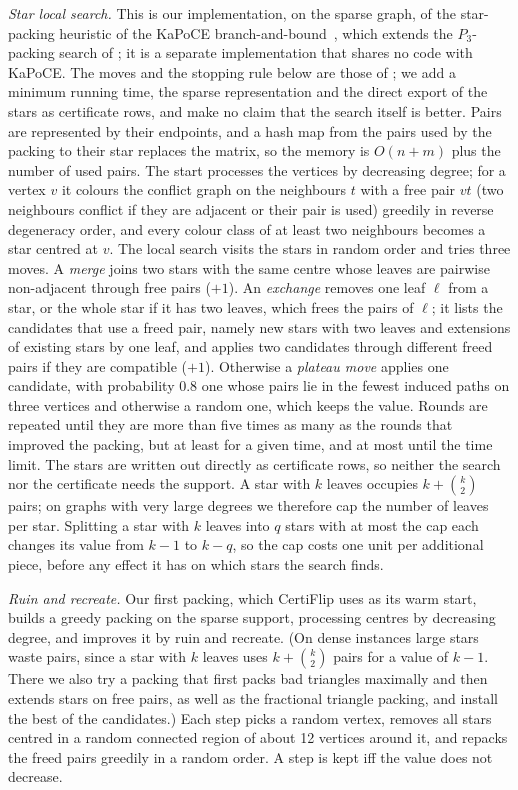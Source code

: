 \emph{Star local search.}  This is our implementation, on the sparse graph,
of the star-packing heuristic of the KaPoCE
branch-and-bound~\cite{BlasiusEtAl22sea}, which extends the $P_3$-packing
search of \citet{GottesburenHSSWZ20}; it is a separate implementation that
shares no code with KaPoCE.  The moves and the stopping rule below are those
of \citet{BlasiusEtAl22sea}; we add a minimum running time, the sparse
representation and the direct export of the stars as certificate rows, and
make no claim that the search itself is better.
Pairs are represented by their endpoints, and a hash map from the pairs used
by the packing to their star replaces the matrix, so the memory is
$O(n+m)$ plus the number of used pairs.  The start processes the vertices
by decreasing degree; for a vertex $v$ it colours the conflict graph on the
neighbours $t$ with a free pair $vt$ (two neighbours conflict if they are
adjacent or their pair is used) greedily in reverse degeneracy order, and
every colour class of at least two neighbours becomes a star centred at
$v$.  The local search visits the stars in random order and tries three
moves.  A \emph{merge} joins two stars with the same centre whose leaves
are pairwise non-adjacent through free pairs ($+1$).  An \emph{exchange}
removes one leaf $\ell$ from a star, or the whole star if it has two leaves,
which frees the pairs of $\ell$; it lists the candidates that use a freed
pair, namely new stars with two leaves and extensions of existing stars by
one leaf, and applies two candidates through different freed pairs if they
are compatible ($+1$).  Otherwise a \emph{plateau move} applies one
candidate, with probability $0.8$ one whose pairs lie in the fewest induced
paths on three vertices and otherwise a random one, which keeps the value.
Rounds are repeated until they are more than five times as many as the
rounds that improved the packing, but at least for a given time, and at
most until the time limit.  The stars are written out directly as
certificate rows, so neither the search nor the certificate needs the
support.  A star with $k$ leaves occupies $k+\binom k2$ pairs; on graphs with
very large degrees we therefore cap the number of leaves per star.  Splitting
a star with $k$ leaves into $q$ stars with at most the cap each changes its
value from $k-1$ to $k-q$, so the cap costs one unit per additional piece,
before any effect it has on which stars the search finds.

\emph{Ruin and recreate.}  Our first packing, which CertiFlip uses as its
warm start, builds a greedy packing on the sparse support, processing
centres by decreasing degree, and improves it by ruin and recreate.
(On dense instances large stars waste pairs, since a star with $k$ leaves
uses $k+\binom k2$ pairs for a value of $k-1$.  There we also try a packing
that first packs bad triangles maximally and then extends stars on free
pairs, as well as the fractional triangle packing, and install the best of
the candidates.)
Each step picks a random vertex, removes all stars centred in a random
connected region of about 12 vertices around it, and repacks the freed
pairs greedily in a random order.  A step is kept iff the value does not
decrease.

